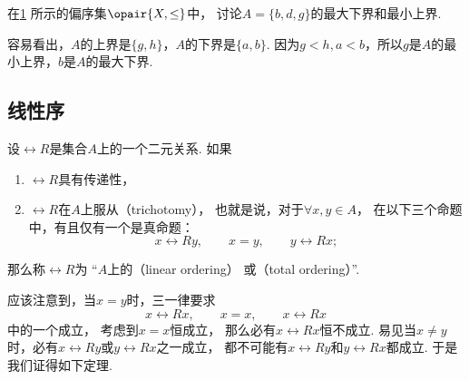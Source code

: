 \begin{example}
在\cref{figure:偏序关系.哈斯图2} 所示的偏序集\(\opair{X,\leq}\)中，
讨论\(A = \{b,d,g\}\)的最大下界和最小上界.
\begin{figure}[hbt]
	\centering
	\caption{}
	\label{figure:偏序关系.哈斯图2}
\end{figure}
\begin{solution}
容易看出，\(A\)的上界是\(\{g,h\}\)，\(A\)的下界是\(\{a,b\}\).
因为\(g<h,a<b\)，所以\(g\)是\(A\)的最小上界，\(b\)是\(A\)的最大下界.
\end{solution}
\end{example}

\subsection{线性序}
\begin{definition}
设\(\rel{R}\)是集合\(A\)上的一个二元关系.
如果\begin{enumerate}
	\item \(\rel{R}\)具有传递性，
	\item \(\rel{R}\)在\(A\)上服从（trichotomy），
	也就是说，对于\(\forall x,y \in A\)，
	在以下三个命题中，有且仅有一个是真命题：\begin{equation*}
		x \rel{R} y, \qquad
		x = y, \qquad
		y \rel{R} x;
	\end{equation*}
\end{enumerate}
那么称\(\rel{R}\)为
“\(A\)上的（linear ordering）
或（total ordering）”.
\end{definition}

应该注意到，当\(x = y\)时，三一律要求\begin{equation*}
	x \rel{R} x, \qquad
	x = x, \qquad
	x \rel{R} x
\end{equation*}中的一个成立，
考虑到\(x = x\)恒成立，
那么必有\(x \rel{R} x\)恒不成立.
易见当\(x \neq y\)时，必有\(x \rel{R} y\)或\(y \rel{R} x\)之一成立，
都不可能有\(x \rel{R} y\)和\(y \rel{R} x\)都成立.
于是我们证得如下定理.

